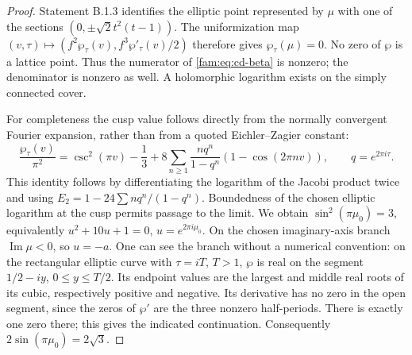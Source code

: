 \begin{proof}
Statement B.1.3 identifies the elliptic point represented by \(\mu\) with
one of the sections \((0,\pm\sqrt2t^2(t-1))\). The uniformization map
\((v,\tau)\mapsto(f^2\wp_\tau(v),f^3\wp'_\tau(v)/2)\) therefore gives
\(\wp_\tau(\mu)=0\). No zero of \(\wp\) is a lattice point. Thus the numerator
of \eqref{fam:eq:cd-beta} is nonzero; the denominator is nonzero as well.
A holomorphic logarithm exists on the simply connected cover.

For completeness the cusp value follows directly from the normally
convergent Fourier expansion, rather than from a quoted Eichler--Zagier
constant:
\begin{equation}\label{fam:eq:cd-wp}
 \frac{\wp_\tau(v)}{\pi^2}
 =\csc^2(\pi v)-\frac13+
 8\sum_{n\geq1}\frac{nq^n}{1-q^n}(1-\cos(2\pi nv)),
 \qquad q=e^{2\pi i\tau}.
\end{equation}
This identity follows by differentiating the logarithm of the Jacobi
product twice and using
\(E_2=1-24\sum nq^n/(1-q^n)\). Boundedness of the chosen elliptic logarithm
at the cusp permits passage to the limit. We obtain
\(\sin^2(\pi\mu_0)=3\), equivalently
\(u^2+10u+1=0\), \(u=e^{2\pi i\mu_0}\).
On the chosen imaginary-axis branch \(\operatorname{Im}\mu<0\), so \(u=-a\).
One can see the branch without a numerical convention: on the rectangular
elliptic curve with \(\tau=iT\), \(T>1\), \(\wp\) is real on the segment
\(1/2-iy\), \(0\leq y\leq T/2\). Its endpoint values are the largest and
middle real roots of its cubic, respectively positive and negative.
Its derivative has no zero in the open segment, since the zeros of
\(\wp'\) are the three nonzero half-periods. There is exactly one zero
there; this gives the indicated continuation. Consequently
\(2\sin(\pi\mu_0)=2\sqrt3\).


\end{proof}
